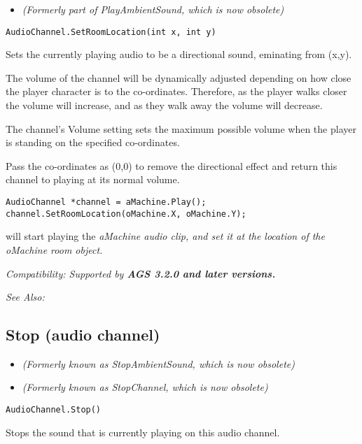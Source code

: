 \begin{itemize}
\item \it{(Formerly part of PlayAmbientSound, which is now obsolete)}
\end{itemize}

\begin{verbatim}
AudioChannel.SetRoomLocation(int x, int y)
\end{verbatim}
Sets the currently playing audio to be a directional sound, eminating from (x,y).

The volume of the channel will be dynamically adjusted depending on how close the player
character is to the co-ordinates. Therefore, as the player walks closer the volume will
increase, and as they walk away the volume will decrease.

The channel's Volume setting sets the maximum possible volume when the player is standing
on the specified co-ordinates.

Pass the co-ordinates as (0,0) to remove the directional effect and return this channel
to playing at its normal volume.

\begin{verbatim}
AudioChannel *channel = aMachine.Play();
channel.SetRoomLocation(oMachine.X, oMachine.Y);
\end{verbatim}
will start playing the \it{aMachine} audio clip, and set it at the location of the \it{oMachine}
room object.

\it{Compatibility:} Supported by \bf{AGS 3.2.0} and later versions.

\it{See Also:} 


\subsection{Stop (audio channel)}\label{AudioChannel.Stop}%

\begin{itemize}
\item \it{(Formerly known as StopAmbientSound, which is now obsolete)}
\item \it{(Formerly known as StopChannel, which is now obsolete)}
\end{itemize}

\begin{verbatim}
AudioChannel.Stop()
\end{verbatim}
Stops the sound that is currently playing on this audio channel.

